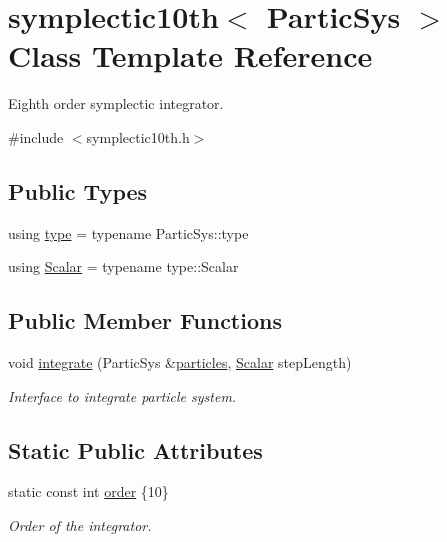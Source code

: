 \hypertarget{classsymplectic10th}{}\section{symplectic10th$<$ Partic\+Sys $>$ Class Template Reference}
\label{classsymplectic10th}


Eighth order symplectic integrator.  




{\ttfamily \#include $<$symplectic10th.\+h$>$}

\subsection*{Public Types}
\begin{DoxyCompactItemize}
\item 
using \mbox{\hyperlink{classsymplectic10th_a4fe3f3c6f8e672f40426f52512e083a5}{type}} = typename Partic\+Sys\+::type
\item 
using \mbox{\hyperlink{classsymplectic10th_a700bbf7a6116e27ac7c6bfd0cc3018bc}{Scalar}} = typename type\+::\+Scalar
\end{DoxyCompactItemize}
\subsection*{Public Member Functions}
\begin{DoxyCompactItemize}
\item 
void \mbox{\hyperlink{classsymplectic10th_aaa762c854968f135a0a6b01c908c7636}{integrate}} (Partic\+Sys \&\mbox{\hyperlink{classparticles}{particles}}, \mbox{\hyperlink{classsymplectic10th_a700bbf7a6116e27ac7c6bfd0cc3018bc}{Scalar}} step\+Length)
\begin{DoxyCompactList}\small\item\em Interface to integrate particle system. \end{DoxyCompactList}\end{DoxyCompactItemize}
\subsection*{Static Public Attributes}
\begin{DoxyCompactItemize}
\item 
static const int \mbox{\hyperlink{classsymplectic10th_af1cb88e94e3022b5bf90091d03c609a4}{order}} \{10\}
\begin{DoxyCompactList}\small\item\em Order of the integrator. \end{DoxyCompactList}\end{DoxyCompactItemize}


